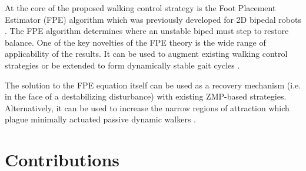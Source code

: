 At the core of the proposed walking control strategy is the Foot Placement Estimator (FPE) algorithm which was previously developed for 2D bipedal robots \cite{Wight:2008vt}. The FPE algorithm determines where an unstable biped must step to restore balance. One of the key novelties of the FPE theory is the wide range of applicability of the results. It can be used to augment existing walking control strategies or be extended to form dynamically stable gait cycles \cite{Wight:2008ii}.

The solution to the FPE equation itself can be used as a recovery mechanism (i.e. in the face of a destabilizing disturbance) with existing ZMP-based strategies. Alternatively, it can be used to increase the narrow regions of attraction which plague minimally actuated passive dynamic walkers \cite{Goswami:1996gn,Asano:2000wi,Kuo:1999tn}.

\section{Contributions} %
\label{sec:contributions}

